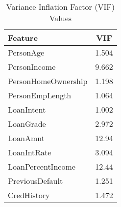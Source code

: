 \begin{table}[H]\centering
\caption{Variance Inflation Factor (VIF) Values}
\label{Table 4:vif_values}
\begin{tabular}{lc}
\toprule
Feature & VIF \\
\midrule
PersonAge & 1.504 \\
PersonIncome & 9.662 \\
PersonHomeOwnership & 1.198 \\
PersonEmpLength & 1.064 \\
LoanIntent & 1.002 \\
LoanGrade & 2.972 \\
LoanAmnt & 12.94 \\
LoanIntRate & 3.094 \\
LoanPercentIncome & 12.44 \\
PreviousDefault & 1.251 \\
CredHistory & 1.472 \\
\bottomrule
\end{tabular}
\end{table}
